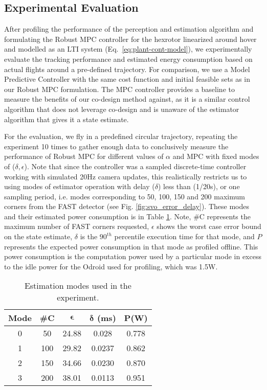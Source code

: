 \subsection{Experimental Evaluation}

After profiling the performance of the perception and estimation algorithm and formulating the Robust MPC controller for the hexrotor linearized around hover and modelled as an LTI system (Eq.~\ref{eq:plant-cont-model}), we experimentally evaluate the tracking performance and estimated energy consumption based on actual flights around a pre-defined trajectory. For comparison, we use a Model Predictive Controller with the same cost function and initial feasible sets as in our Robust MPC formulation. The MPC controller provides a baseline to measure the benefits of our co-design method against, as it is a similar control algorithm that does not leverage co-design and is unaware of the estimator algorithm that gives it a state estimate. 

For the evaluation, we fly in a predefined circular trajectory, repeating the experiment 10 times to gather enough data to conclusively measure the performance of Robust MPC for different values of $\alpha$ and MPC with fixed modes of ($\delta,\epsilon$). Note that since the controller was a sampled discrete-time controller working with simulated 20Hz camera updates, this realistically restricts us to using modes of estimator operation with delay ($\delta$) less than (1/20s), or one sampling period, i.e. modes corresponding to 50, 100, 150 and 200 maximum corners from the FAST detector (see Fig. \ref{fig:svo_error_delay}). 
These modes and their estimated power consumption is in Table \ref{tbl:modes_exp}. 
Note, \#C represents the maximum number of FAST corners requested, $\epsilon$ shows the worst case error bound on the state estimate, $\delta$ is the $90^{th}$ percentile execution time for that mode, and $P$ represents the expected power consumption in that mode as profiled offline. 
This power consumption is the computation power used by a particular mode in excess to the idle power for the Odroid used for profiling, which was 1.5W.

\begin{table}[htb]
\begin{center}
\caption{Estimation modes used in the experiment.}
\label{tbl:modes_exp}
\begin{tabular} {|c|c|c|c|c|}
	\hline
	\textbf{Mode} & \textbf{\#C} & $\pmb{\epsilon}$ & $\pmb{\delta}$ \textbf{(ms)} & $\pmb{P}$\textbf{(W)} \\ \hline
	0 & 50 &  24.88 & 0.028 &  0.778  \\ \hline
 	1 & 100 & 29.82 & 0.0237 &  0.862  \\ \hline
	2 & 150 & 34.66 & 0.0230 & 0.870 \\ \hline
	3 & 200 & 38.01 & 0.0113 & 0.951 \\ \hline
	\end{tabular}	
	\end{center}
\end{table}


